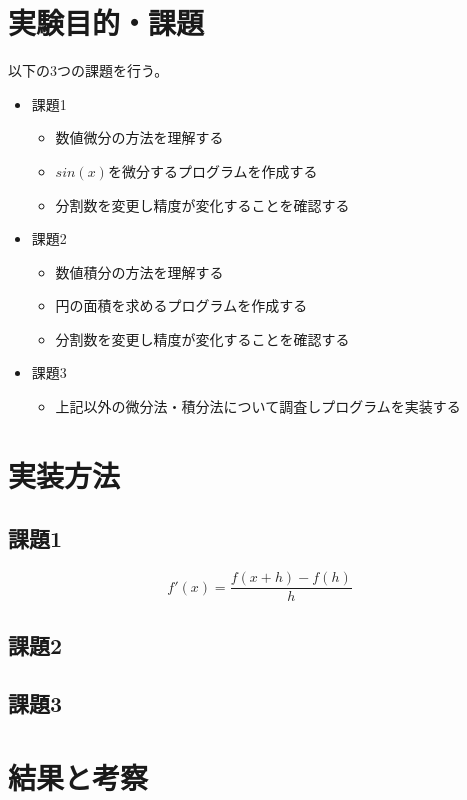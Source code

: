 \documentclass[dvipdfmx]{jsarticle}
\begin{document}
\section{実験目的・課題}
以下の3つの課題を行う。
\begin{itemize}
  \item 課題1
  \begin{itemize}
    \item 数値微分の方法を理解する
    \item $sin(x)$を微分するプログラムを作成する
    \item 分割数を変更し精度が変化することを確認する
  \end{itemize}
  \item 課題2
  \begin{itemize}
    \item 数値積分の方法を理解する
    \item 円の面積を求めるプログラムを作成する
    \item 分割数を変更し精度が変化することを確認する
  \end{itemize}
  \item 課題3
  \begin{itemize}
    \item 上記以外の微分法・積分法について調査しプログラムを実装する
  \end{itemize}
\end{itemize}

\section{実装方法}

\subsection{課題1}

\begin{equation}
  f'(x) =  \frac{f(x+h)-f(h)}{h}
\end{equation}

\subsection{課題2}
\subsection{課題3}

\section{結果と考察}

\begin{thebibliography}{10}
  
  \url{}
\end{thebibliography}
\end{document}
